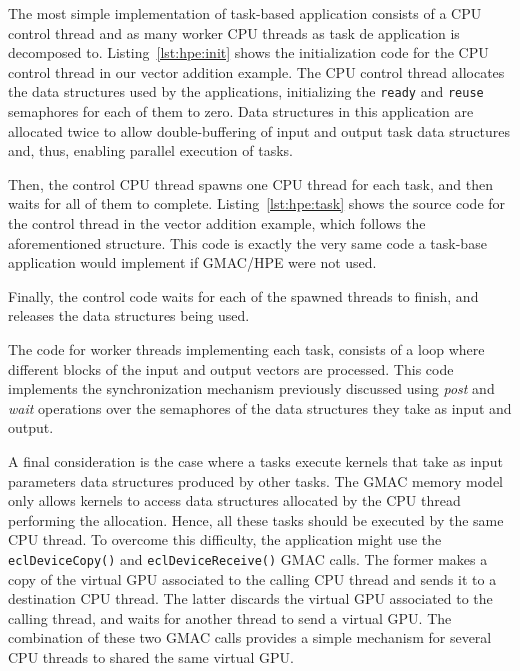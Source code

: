 

The most simple implementation of task\hyp{}based application consists of a CPU control thread and 
as many worker CPU threads as task de application is decomposed to. Listing~\ref{lst:hpe:init} shows 
the initialization code for the CPU control thread in our vector addition example. The CPU control 
thread allocates the data structures used by the applications, initializing the \texttt{ready} and 
\texttt{reuse} semaphores for each of them to zero. Data structures in this application are 
allocated twice to allow double\hyp{}buffering of input and output task data structures and, thus, 
enabling parallel execution of tasks.



Then, the control CPU thread spawns one CPU thread for each task, and then waits for all of them to 
complete. Listing~\ref{lst:hpe:task} shows the source code for the control thread in the vector 
addition example, which follows the aforementioned structure. This code is exactly the very same 
code a task\hyp{}base application would implement if GMAC\slash HPE were not used.


Finally, the control code waits for each of the spawned threads to finish, and releases the data 
structures being used.

The code for worker threads implementing each task, consists of a loop where different blocks of the 
input and output vectors are processed. This code implements the synchronization mechanism 
previously discussed using \emph{post} and \emph{wait} operations over the semaphores of the data 
structures they take as input and output.

A final consideration is the case where a tasks execute kernels that take as input parameters data 
structures produced by other tasks. The GMAC memory model only allows kernels to access data 
structures allocated by the CPU thread performing the allocation. Hence, all these tasks should be 
executed by the same CPU thread. To overcome this difficulty, the application might use the
\texttt{ecl\-Device\-Copy()} and \texttt{ecl\-Device\-Receive()} GMAC calls. The former makes a copy 
of the virtual GPU associated to the calling CPU thread and sends it to a destination CPU thread.  
The latter discards the virtual GPU associated to the calling thread, and waits for another thread 
to send a virtual GPU\@. The combination of these two GMAC calls provides a simple mechanism for 
several CPU threads to shared the same virtual GPU.

